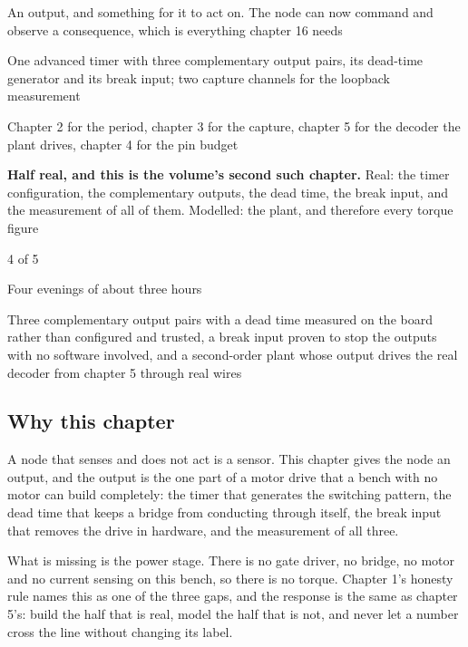 
\begin{keyfacts}
\item[Adds to the node] An output, and something for it to act on. The node can now command and observe a consequence, which is everything chapter 16 needs
\item[Peripherals] One advanced timer with three complementary output pairs, its dead-time generator and its break input; two capture channels for the loopback measurement
\item[Depends on] Chapter 2 for the period, chapter 3 for the capture, chapter 5 for the decoder the plant drives, chapter 4 for the pin budget
\item[Real or modelled] \textbf{Half real, and this is the volume's second such chapter.} Real: the timer configuration, the complementary outputs, the dead time, the break input, and the measurement of all of them. Modelled: the plant, and therefore every torque figure
\item[Difficulty] 4 of 5
\item[Effort] Four evenings of about three hours
\item[Deliverable] Three complementary output pairs with a dead time measured on the board rather than configured and trusted, a break input proven to stop the outputs with no software involved, and a second-order plant whose output drives the real decoder from chapter 5 through real wires
\end{keyfacts}

\subsection*{Why this chapter}

A node that senses and does not act is a sensor. This chapter gives the node an
output, and the output is the one part of a motor drive that a bench with no
motor can build completely: the timer that generates the switching pattern, the
dead time that keeps a bridge from conducting through itself, the break input
that removes the drive in hardware, and the measurement of all three.

What is missing is the power stage. There is no gate driver, no bridge, no
motor and no current sensing on this bench, so there is no torque. Chapter 1's
honesty rule names this as one of the three gaps, and the response is the same
as chapter 5's: build the half that is real, model the half that is not, and
never let a number cross the line without changing its label.

